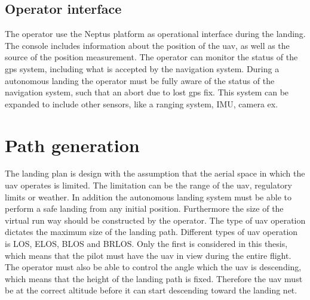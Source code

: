 \subsection{Operator interface}
The operator use the Neptus platform as operational interface during the landing. The console includes information about the position of the uav, as well as the source of the position measurement. The operator can monitor the status of the gps system, including what is accepted by the navigation system. During a autonomous landing the operator must be fully aware of the status of the navigation system, such that an abort due to lost gps fix. This system can be expanded to include other sensors, like a ranging system, IMU, camera ex.
\section{Path generation}
The landing plan is design with the assumption that the aerial space in which the uav operates is limited. The limitation can be the range of the uav, regulatory limits or weather. In addition the autonomous landing system must be able to perform a safe landing from any initial position. Furthermore the size of the virtual run way should be constructed by the operator. The type of uav operation dictates the maximum size of the landing path. Different types of uav operation is LOS, ELOS, BLOS and BRLOS. Only the first is considered in this thesis, which means that the pilot must have the uav in view during the entire flight. The operator must also be able to control the angle which the uav is descending, which means that the height of the landing path is fixed. Therefore the uav must be at the correct altitude before it can start descending toward the landing net.

